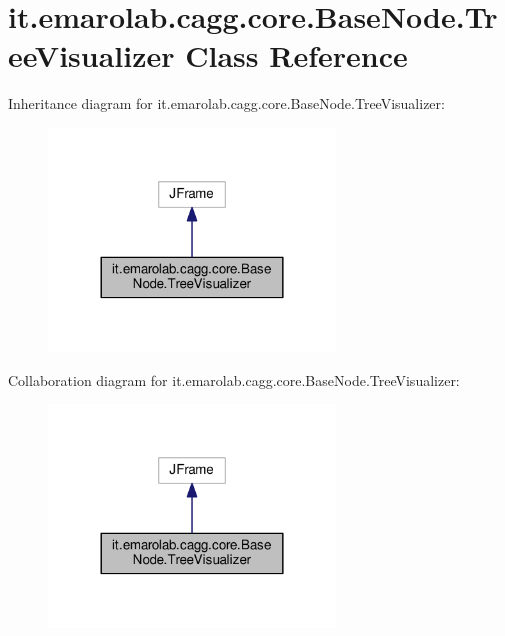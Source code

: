 \hypertarget{classit_1_1emarolab_1_1cagg_1_1core_1_1BaseNode_1_1TreeVisualizer}{\section{it.\-emarolab.\-cagg.\-core.\-Base\-Node.\-Tree\-Visualizer Class Reference}
\label{classit_1_1emarolab_1_1cagg_1_1core_1_1BaseNode_1_1TreeVisualizer}
}


Inheritance diagram for it.\-emarolab.\-cagg.\-core.\-Base\-Node.\-Tree\-Visualizer\-:\nopagebreak
\begin{figure}[H]
\begin{center}
\leavevmode
\includegraphics[width=216pt]{classit_1_1emarolab_1_1cagg_1_1core_1_1BaseNode_1_1TreeVisualizer__inherit__graph}
\end{center}
\end{figure}


Collaboration diagram for it.\-emarolab.\-cagg.\-core.\-Base\-Node.\-Tree\-Visualizer\-:\nopagebreak
\begin{figure}[H]
\begin{center}
\leavevmode
\includegraphics[width=216pt]{classit_1_1emarolab_1_1cagg_1_1core_1_1BaseNode_1_1TreeVisualizer__coll__graph}
\end{center}
\end{figure}
